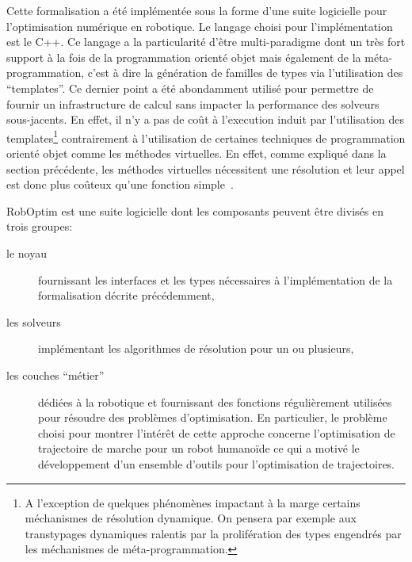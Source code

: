 Cette formalisation a été implémentée sous la forme d'une suite
logicielle pour l'optimisation numérique en robotique. Le langage
choisi pour l'implémentation est le C++. Ce langage a la particularité
d'être multi-paradigme dont un très fort support à la fois de la
programmation orienté objet mais également de la méta-programmation,
c'est à dire la génération de familles de types via l'utilisation des
``templates''. Ce dernier point a été abondamment utilisé pour
permettre de fournir un infrastructure de calcul sans impacter la
performance des solveurs sous-jacents. En effet, il n'y a pas de coût
à l'execution induit par l'utilisation des templates\footnote{A
  l'exception de quelques phénomènes impactant à la marge certains
  méchanismes de résolution dynamique. On pensera par exemple aux
  transtypages dynamiques ralentis par la prolifération des types
  engendrés par les méchanismes de méta-programmation.} contrairement
à l'utilisation de certaines techniques de programmation orienté objet
comme les méthodes virtuelles. En effet, comme expliqué dans la
section précédente, les méthodes virtuelles nécessitent une résolution
et leur appel est donc plus coûteux qu'une fonction
simple~\citep{driesen1996direct}.


RobOptim est une suite logicielle dont les composants peuvent être
divisés en trois groupes:
\begin{description}
\item[le noyau] fournissant les interfaces et les types nécessaires à
  l'implémentation de la formalisation décrite précédemment,
\item[les solveurs] implémentant les algorithmes de résolution pour un ou plusieurs,
\item[les couches ``métier''] dédiées à la robotique et fournissant
  des fonctions régulièrement utilisées pour résoudre des problèmes
  d'optimisation. En particulier, le problème choisi pour montrer
  l'intérêt de cette approche concerne l'optimisation de trajectoire
  de marche pour un robot humanoïde ce qui a motivé le développement
  d'un ensemble d'outils pour l'optimisation de trajectoires.
\end{description}

